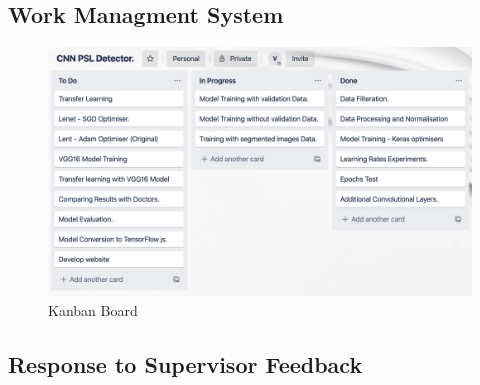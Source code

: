 \pagebreak
\subsection{Work Managment System}
\begin{figure}[!htp]
    \centering
    \includegraphics[width=15cm]{Images/Kanban Bords.png}
    \caption{Kanban Board}
\end{figure}
\pagebreak
\subsection{Response to Supervisor Feedback}
\pagebreak


